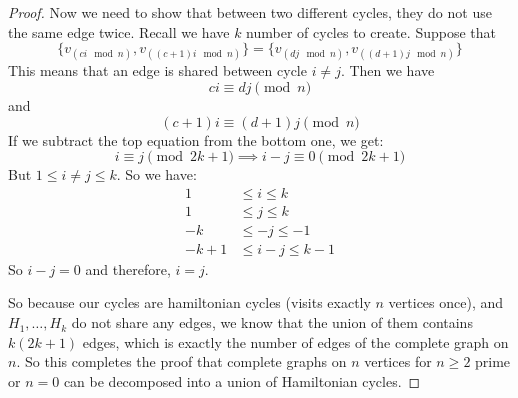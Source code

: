 \documentclass{article}
\begin{document}
\begin{proof}
        Now we need to show that between two different cycles, they do not use the same edge twice. Recall we have $k$ number of cycles to create. Suppose that 
            \begin{equation*}
                \{v_{(ci \mod{n})}, v_{((c + 1)i \mod{n})}\} = \{v_{(dj \mod{n})}, v_{((d + 1)j \mod{n})}\}
            \end{equation*}
        This means that an edge is shared between cycle $i \neq j$. Then we have
            \begin{equation*}
                ci \equiv dj \pmod{n}
            \end{equation*}
        and
            \begin{equation*}
                (c + 1)i \equiv (d + 1)j \pmod{n}
            \end{equation*}
        If we subtract the top equation from the bottom one, we get:
            \begin{equation*}
                i \equiv j \pmod{2k + 1} \implies i - j \equiv 0 \pmod{2k + 1}
            \end{equation*}
        But $1 \leq i \neq j \leq k$. So we have:
            \begin{align*}
                1      &\leq   i \leq k         \\
                1      & \leq  j \leq k         \\
                -k     &\leq  -j \leq -1        \\
                -k + 1 &\leq   i - j \leq k - 1   
            \end{align*}
        So $i - j = 0$ and therefore, $i = j$.

        So because our cycles are hamiltonian cycles (visits exactly $n$ vertices once), and $H_{1}, \ldots, H_{k}$ do not share any edges, we know that the union of them contains $k(2k + 1)$ edges, which is exactly the number of edges of the complete graph on $n$. So this completes the proof that complete graphs on $n$ vertices for $n \geq 2$ prime or $n = 0$ can be decomposed into a union of Hamiltonian cycles.
    \end{proof}
\end{document}
